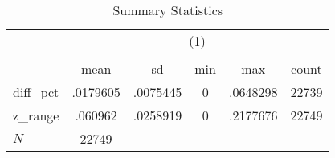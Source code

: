 \begin{table}[htbp]\centering
\def\sym#1{\ifmmode^{#1}\else\(^{#1}\)\fi}
\caption{Summary Statistics}
\begin{tabular}{l*{1}{ccccc}}
\hline\hline
            &\multicolumn{5}{c}{(1)}                                         \\
            &\multicolumn{5}{c}{}                                            \\
            &        mean&          sd&         min&         max&       count\\
\hline
diff\_pct    &    .0179605&    .0075445&           0&    .0648298&       22739\\
z\_range     &     .060962&    .0258919&           0&    .2177676&       22749\\
\hline
\(N\)       &       22749&            &            &            &            \\
\hline\hline
\end{tabular}
\end{table}
